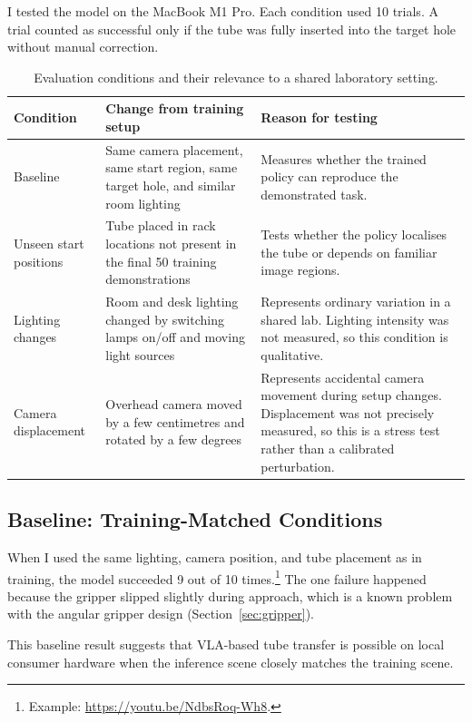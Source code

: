 \documentclass[11pt, a4paper]{article}
\begin{document}
I tested the model on the MacBook M1 Pro. Each condition used 10 trials. A trial counted as successful only if the tube was fully inserted into the target hole without manual correction.

\begin{table}[H]
\centering
\renewcommand{\arraystretch}{1.2}
\begin{tabular}{@{}p{}p{}p{}@{}}
\toprule
\textbf{Condition} & \textbf{Change from training setup} & \textbf{Reason for testing} \\ \midrule
Baseline & Same camera placement, same start region, same target hole, and similar room lighting & Measures whether the trained policy can reproduce the demonstrated task. \\
Unseen start positions & Tube placed in rack locations not present in the final 50 training demonstrations & Tests whether the policy localises the tube or depends on familiar image regions. \\
Lighting changes & Room and desk lighting changed by switching lamps on/off and moving light sources & Represents ordinary variation in a shared lab. Lighting intensity was not measured, so this condition is qualitative. \\
Camera displacement & Overhead camera moved by a few centimetres and rotated by a few degrees & Represents accidental camera movement during setup changes. Displacement was not precisely measured, so this is a stress test rather than a calibrated perturbation. \\
\bottomrule
\end{tabular}
\caption{Evaluation conditions and their relevance to a shared laboratory setting.}
\label{tab:evaluation-conditions}
\end{table}

\subsection{Baseline: Training-Matched Conditions}
\label{sec:baseline}

When I used the same lighting, camera position, and tube placement as in training, the model succeeded 9 out of 10 times.\footnote{Example: \url{https://youtu.be/NdbsRoq-Wh8}.} The one failure happened because the gripper slipped slightly during approach, which is a known problem with the angular gripper design (Section~\ref{sec:gripper}).

This baseline result suggests that VLA-based tube transfer is possible on local consumer hardware when the inference scene closely matches the training scene.
\end{document}

